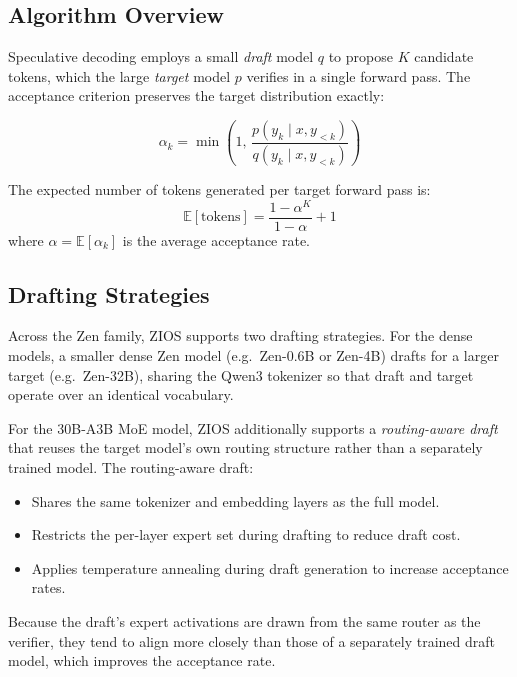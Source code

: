 \documentclass[11pt,a4paper]{article}
\begin{document}
\subsection{Algorithm Overview}

Speculative decoding employs a small \emph{draft} model $q$ to propose $K$ candidate tokens, which the large \emph{target} model $p$ verifies in a single forward pass. The acceptance criterion preserves the target distribution exactly:

\begin{equation}
\alpha_k = \min\!\left(1,\, \frac{p(y_k \mid x, y_{<k})}{q(y_k \mid x, y_{<k})}\right)
\end{equation}

The expected number of tokens generated per target forward pass is:
\begin{equation}
\mathbb{E}[\text{tokens}] = \frac{1 - \alpha^K}{1 - \alpha} + 1
\end{equation}
where $\alpha = \mathbb{E}[\alpha_k]$ is the average acceptance rate.

\subsection{Drafting Strategies}

Across the Zen family, ZIOS supports two drafting strategies. For the dense models, a smaller dense Zen model (e.g.\ Zen-0.6B or Zen-4B) drafts for a larger target (e.g.\ Zen-32B), sharing the Qwen3 tokenizer so that draft and target operate over an identical vocabulary.

For the 30B-A3B MoE model, ZIOS additionally supports a \emph{routing-aware draft} that reuses the target model's own routing structure rather than a separately trained model. The routing-aware draft:

\begin{itemize}
  \item Shares the same tokenizer and embedding layers as the full model.
  \item Restricts the per-layer expert set during drafting to reduce draft cost.
  \item Applies temperature annealing during draft generation to increase acceptance rates.
\end{itemize}

Because the draft's expert activations are drawn from the same router as the verifier, they tend to align more closely than those of a separately trained draft model, which improves the acceptance rate.
\end{document}
